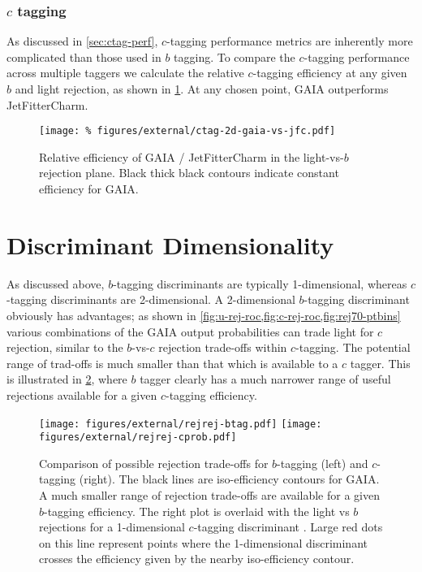 \subsubsection{$c$ tagging}

As discussed in \cref{sec:ctag-perf}, $c$-tagging performance metrics are inherently more complicated than those used in $b$ tagging.
To compare the $c$-tagging performance across multiple taggers we calculate the relative $c$-tagging efficiency at any given $b$ and light rejection, as shown in \cref{fig:ctag-gaia-vs-jfc}.
At any chosen point, GAIA outperforms JetFitterCharm.

\begin{figure}
  \begin{center}
  \texttt{[image: \%
    figures/external/ctag-2d-gaia-vs-jfc.pdf]}
  \caption[Charm jet efficiency comparison in duel-rejection plane]{%
    Relative efficiency of GAIA / JetFitterCharm in the light-vs-$b$ rejection plane. Black thick black contours indicate constant efficiency for GAIA.}
  \label{fig:ctag-gaia-vs-jfc}
  \end{center}
\end{figure}


\section{Discriminant Dimensionality}

As discussed above, $b$-tagging discriminants are typically 1-dimensional, whereas $c$-tagging discriminants are 2-dimensional.
A 2-dimensional $b$-tagging discriminant obviously has advantages; as shown in \cref{fig:u-rej-roc,fig:c-rej-roc,fig:rej70-ptbins} various combinations of the GAIA output probabilities can trade light for $c$ rejection, similar to the $b$-vs-$c$ rejection trade-offs within $c$-tagging. The potential range of trad-offs is much smaller than that which is available to a $c$ tagger.
This is illustrated in \cref{fig:btag-vs-ctag-rejrej}, where $b$ tagger clearly has a much narrower range of useful rejections available for a given $c$-tagging efficiency.

\begin{figure}
  \texttt{[image: figures/external/rejrej-btag.pdf]}
  \texttt{[image: figures/external/rejrej-cprob.pdf]}
  \caption[Rejection Trade-offs for $b$ and $c$ tagging]{%
    Comparison of possible rejection trade-offs for $b$-tagging (left) and $c$-tagging (right).
The black lines are iso-efficiency contours for GAIA.
A much smaller range of rejection trade-offs are available for a given $b$-tagging efficiency. The right plot is overlaid with the light vs $b$ rejections for a 1-dimensional $c$-tagging discriminant . Large red dots on this line represent points where the 1-dimensional discriminant crosses the efficiency given by the nearby iso-efficiency contour.}
  \label{fig:btag-vs-ctag-rejrej}
\end{figure}

